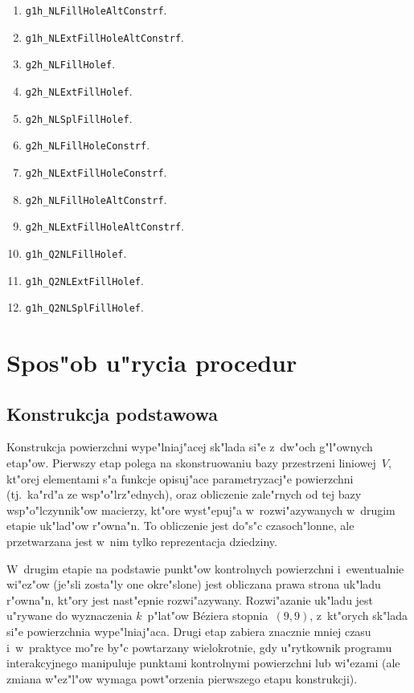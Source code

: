 \begin{enumerate}
\addtocounter{enumi}{1}
\item \texttt{g1h\_NLFillHoleAltConstrf}.
\item \texttt{g1h\_NLExtFillHoleAltConstrf}.
\addtocounter{enumi}{1}
\item \texttt{g2h\_NLFillHolef}.
\item \texttt{g2h\_NLExtFillHolef}.
\item \texttt{g2h\_NLSplFillHolef}.
\item \texttt{g2h\_NLFillHoleConstrf}.
\item \texttt{g2h\_NLExtFillHoleConstrf}.
\addtocounter{enumi}{1}
\item \texttt{g2h\_NLFillHoleAltConstrf}.
\item \texttt{g2h\_NLExtFillHoleAltConstrf}.
\addtocounter{enumi}{1}
\item \texttt{g1h\_Q2NLFillHolef}.
\item \texttt{g1h\_Q2NLExtFillHolef}.
\item \texttt{g1h\_Q2NLSplFillHolef}.
\end{enumerate}

\newpage
\section{Spos"ob u"rycia procedur}

\subsection{Konstrukcja podstawowa}

\begin{sloppypar}
Konstrukcja powierzchni wype"lniaj"acej sk"lada si"e z~dw"och g"l"ownych
etap"ow. Pierwszy etap polega na skonstruowaniu bazy przestrzeni liniowej~$V$,
kt"orej elementami s"a funkcje opisuj"ace parametryzacj"e powierzchni
(tj.\ ka"rd"a ze wsp"o"lrz"ednych), oraz obliczenie zale"rnych od tej bazy
wsp"o"lczynnik"ow macierzy, kt"ore wyst"epuj"a w~rozwi"azywanych w~drugim
etapie uk"lad"ow r"owna"n. To obliczenie jest do"s"c czasoch"lonne,
ale przetwarzana jest w~nim tylko reprezentacja dziedziny.%
\end{sloppypar}

W~drugim etapie na podstawie punkt"ow kontrolnych powierzchni i~ewentualnie
wi"ez"ow (je"sli zosta"ly one okre"slone) jest obliczana prawa strona
uk"ladu r"owna"n, kt"ory jest nast"epnie rozwi"azywany. Rozwi"azanie uk"ladu
jest u"rywane do wyznaczenia $k$~p"lat"ow B\'{e}ziera stopnia~$(9,9)$,
z~kt"orych sk"lada si"e powierzchnia wype"lniaj"aca. Drugi etap
zabiera znacznie mniej czasu i~w~praktyce mo"re by"c powtarzany wielokrotnie,
gdy u"rytkownik programu interakcyjnego manipuluje punktami kontrolnymi
powierzchni lub wi"ezami (ale zmiana w"ez"l"ow wymaga powt"orzenia pierwszego
etapu konstrukcji).

